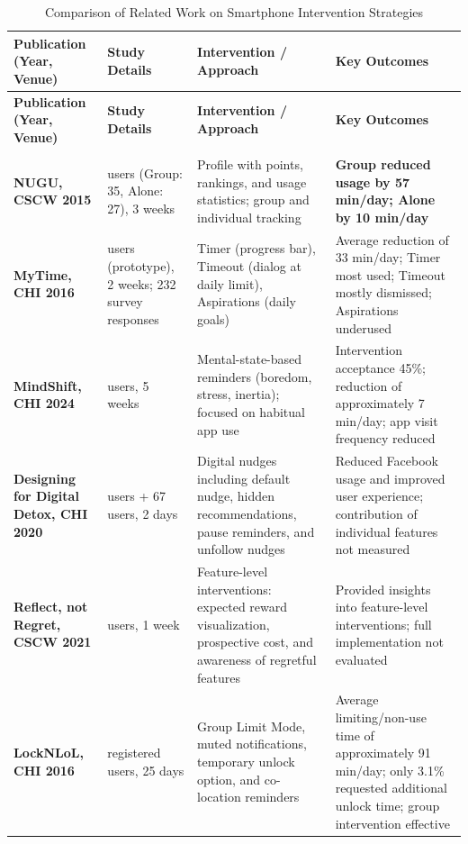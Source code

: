 \documentclass[11pt]{report}
\begin{document}
\begin{center} 
  \footnotesize 
  \begin{longtable}
    {|>{\raggedright\arraybackslash}p{}| >{\raggedright\arraybackslash}p{}| >{\raggedright\arraybackslash}p{}| >{\raggedright\arraybackslash}p{}|} 
    \caption{Comparison of Related Work on Smartphone Intervention Strategies} 
    \label{tab:literature_survey}\\ 
    \hline 
    \textbf{Publication (Year, Venue)} & \textbf{Study Details} & \textbf{Intervention / Approach} & \textbf{Key Outcomes} \\ 
    \hline \endfirsthead 
    \hline 
    \textbf{Publication (Year, Venue)} & \textbf{Study Details} & \textbf{Intervention / Approach} & \textbf{Key Outcomes} \\ 
    \hline \endhead \hline \multicolumn{4}{r}{\textit{Continued on next page}} \\ 
    \hline \endfoot \hline \endlastfoot 
    \textbf{NUGU, CSCW 2015} & 114 users (Group: 35, Alone: 27), 3 weeks & Profile with points, rankings, and usage statistics; group and individual tracking & \textbf{Group reduced usage by 57 min/day; Alone by 10 min/day} \\ 
    \hline \textbf{MyTime, CHI 2016} & 23 users (prototype), 2 weeks; 232 survey responses & Timer (progress bar), Timeout (dialog at daily limit), Aspirations (daily goals) & Average reduction of 33 min/day; Timer most used; Timeout mostly dismissed; Aspirations underused \\ 
    \hline \textbf{MindShift, CHI 2024} & 25 users, 5 weeks & Mental-state-based reminders (boredom, stress, inertia); focused on habitual app use & Intervention acceptance 45\%; reduction of approximately 7 min/day; app visit frequency reduced \\ 
    \hline \textbf{Designing for Digital Detox, CHI 2020} & 14 users + 67 users, 2 days & Digital nudges including default nudge, hidden recommendations, pause reminders, and unfollow nudges & Reduced Facebook usage and improved user experience; contribution of individual features not measured \\ 
    \hline \textbf{Reflect, not Regret, CSCW 2021} & 29 users, 1 week & Feature-level interventions: expected reward visualization, prospective cost, and awareness of regretful features & Provided insights into feature-level interventions; full implementation not evaluated \\ 
    \hline \textbf{LockNLoL, CHI 2016} & 976 registered users, 25 days & Group Limit Mode, muted notifications, temporary unlock option, and co-location reminders & Average limiting/non-use time of approximately 91 min/day; only 3.1\% requested additional unlock time; group intervention effective \\ 

\end{longtable}
\end{center}
\end{document}
